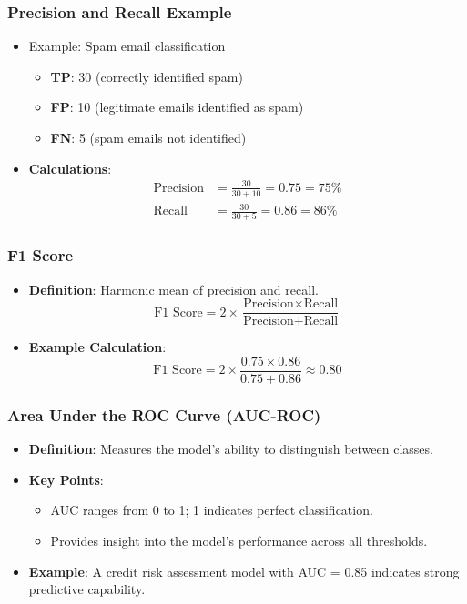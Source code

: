 \documentclass[aspectratio=169]{beamer}
\begin{document}
\begin{frame}[fragile]
    \frametitle{Precision and Recall Example}
    \begin{itemize}
        \item Example: Spam email classification
        \begin{itemize}
            \item \textbf{TP}: 30 (correctly identified spam)
            \item \textbf{FP}: 10 (legitimate emails identified as spam)
            \item \textbf{FN}: 5 (spam emails not identified)
        \end{itemize}
        \item \textbf{Calculations}:
        \begin{align*}
            \text{Precision} & = \frac{30}{30 + 10} = 0.75 = 75\% \\
            \text{Recall} & = \frac{30}{30 + 5} = 0.86 = 86\%
        \end{align*}
    \end{itemize}
\end{frame}

\begin{frame}[fragile]
    \frametitle{F1 Score}
    \begin{itemize}
        \item \textbf{Definition}: Harmonic mean of precision and recall.
        \begin{equation}
            \text{F1 Score} = 2 \times \frac{\text{Precision} \times \text{Recall}}{\text{Precision} + \text{Recall}}
        \end{equation}
        \item \textbf{Example Calculation}:
        \begin{equation}
            \text{F1 Score} = 2 \times \frac{0.75 \times 0.86}{0.75 + 0.86} \approx 0.80
        \end{equation}
    \end{itemize}
\end{frame}

\begin{frame}[fragile]
    \frametitle{Area Under the ROC Curve (AUC-ROC)}
    \begin{itemize}
        \item \textbf{Definition}: Measures the model's ability to distinguish between classes.
        \item \textbf{Key Points}:
        \begin{itemize}
            \item AUC ranges from 0 to 1; 1 indicates perfect classification.
            \item Provides insight into the model's performance across all thresholds.
        \end{itemize}
        \item \textbf{Example}: A credit risk assessment model with AUC = 0.85 indicates strong predictive capability.
    \end{itemize}
\end{frame}
\end{document}
